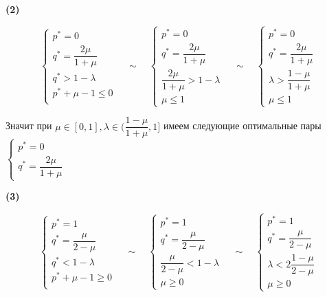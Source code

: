 \textbf{(2)}

$$
	\begin{cases}
		p^* = 0 \\
		q^* = \dfrac{2 \mu}{1 + \mu} \\
		q^* > 1 - \lambda \\
		p^* + \mu - 1 \leqslant 0 \\
	\end{cases}
	\quad \sim \quad
	\begin{cases}
		p^* = 0 \\
		q^* = \dfrac{2\mu}{1 + \mu} \\
		\dfrac{2\mu}{1 + \mu} > 1 - \lambda \\
		\mu \leqslant 1
	\end{cases}
	\quad \sim \quad
	\begin{cases}
		p^* = 0 \\
		q^* = \dfrac{2 \mu}{1 + \mu} \\
		\lambda > \dfrac{1 - \mu}{1 + \mu} \\
		\mu \leqslant 1
	\end{cases}
$$

Значит при $\mu \in [0, 1], \lambda \in (\dfrac{1 - \mu}{1 + \mu}, 1]$
имеем следующие оптимальные пары
$
\begin{cases}
	p^* = 0 \\
	q^* = \dfrac{2\mu}{1 + \mu} 
\end{cases}
$



\textbf{(3)}

$$
	\begin{cases}
		p^* = 1 \\
		q^* = \dfrac{\mu}{2 - \mu} \\
		q^* < 1 - \lambda \\
		p^* + \mu - 1 \geqslant 0 \\
	\end{cases}
	\quad \sim \quad
	\begin{cases}
		p^* = 1 \\
		q^* = \dfrac{\mu}{2 - \mu} \\
		\dfrac{\mu}{2 - \mu} < 1 - \lambda \\
		\mu \geqslant 0
	\end{cases}
	\quad \sim \quad
	\begin{cases}
		p^* = 1 \\
		q^* = \dfrac{\mu}{2 - \mu} \\
		\lambda < 2\dfrac{1 - \mu}{2 - \mu} \\
		\mu \geqslant 0
	\end{cases}
$$

